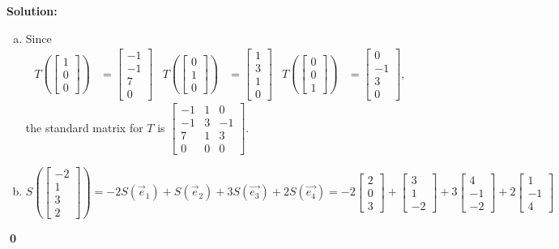\documentclass{article}
\newenvironment{solution}
{
  \ignorespaces
  \textbf{Solution:}
}
{
  \ignorespacesafterend
  \begin{flushright}
  {\bfseries \qed}
  \end{flushright}
}
\begin{document}
\begin{solution}
\begin{enumerate}[(a)]
\item Since
\begin{align*}
T\left(\begin{bmatrix} 1 \\ 0 \\ 0  \end{bmatrix}\right) &= \begin{bmatrix} -1 \\ -1 \\ 7 \\0\end{bmatrix} &
T\left(\begin{bmatrix} 0 \\ 1 \\ 0 \end{bmatrix}\right) &= \begin{bmatrix} 1 \\ 3 \\ 1 \\0 \end{bmatrix}  &
T\left(\begin{bmatrix} 0 \\ 0 \\ 1 \end{bmatrix}\right) &= \begin{bmatrix} 0 \\ -1 \\ 3 \\ 0  \end{bmatrix}, 
\end{align*}
the standard matrix for \(T\) is \( \begin{bmatrix} -1 & 1 & 0 \\ -1 & 3 & -1 \\ 7 & 1 & 3  \\ 0 & 0 & 0 \end{bmatrix} \).
\item \[
S\left(\begin{bmatrix} -2 \\ 1 \\ 3 \\ 2 \end{bmatrix} \right) = -2S(\vec{e}_1)+S(\vec{e}_2)+3S(\vec{e_3})+2S(\vec{e_4})
= -2 \begin{bmatrix} 2 \\ 0 \\ 3 \end{bmatrix} + \begin{bmatrix} 3 \\ 1 \\ -2 \end{bmatrix} + 3 \begin{bmatrix} 4 \\ -1 \\ -2 \end{bmatrix}+2\begin{bmatrix} 1 \\ -1 \\ 4 \end{bmatrix} 
\]
\end{enumerate}
\end{solution}
\end{document}
